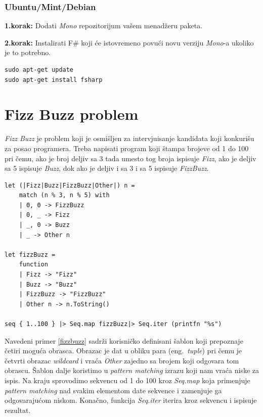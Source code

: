 \documentclass[a4paper]{article}
\begin{document}
\subsubsection{Ubuntu/Mint/Debian}

\textbf{1.korak:} Dodati {\em Mono} \cite{mono} repozitorijum vašem menadžeru paketa.

\textbf{2.korak:} Instalirati F\# koji će istovremeno povući novu verziju {\em Mono}-a ukoliko je to potrebno.
\\
\begin{lstlisting}
sudo apt-get update
sudo apt-get install fsharp
\end{lstlisting}
 
\section{Fizz Buzz problem}
\label{sec:fizzbuzz}
\textit{Fizz Buzz} je problem koji je osmišljen za intervjuisanje kandidata koji konkurišu za posao programera. Treba napisati program koji štampa brojeve od 1 do 100 pri čemu, ako je broj deljiv sa 3 tada umesto tog broja ispisuje \textit{Fizz}, ako je deljiv sa 5 ispisuje \textit{Buzz}, dok ako je deljiv i sa 3 i sa 5 ispisuje \textit{FizzBuzz}. \\

\begin{lstlisting}[caption={Fizz Buzz \cite{fizzBuzz}},frame=single, label=fizzbuzz]
let (|Fizz|Buzz|FizzBuzz|Other|) n =
    match (n % 3, n % 5) with
    | 0, 0 -> FizzBuzz
    | 0, _ -> Fizz
    | _, 0 -> Buzz
    | _ -> Other n

let fizzBuzz =
    function
    | Fizz -> "Fizz"
    | Buzz -> "Buzz"
    | FizzBuzz -> "FizzBuzz"
    | Other n -> n.ToString()

seq { 1..100 } |> Seq.map fizzBuzz|> Seq.iter (printfn "%s")
\end{lstlisting}

Navedeni primer \ref{fizzbuzz} sadrži korisničko definisani šablon koji prepoznaje četiri moguća obrasca. Obrazac je dat u obliku para (eng.~{\em tuple}) pri čemu je četvrti obrazac \textit{wildcard} i vraća \textit{Other} zajedno sa brojem koji odgovara tom obrascu. Šablon dalje koristimo u \textit{pattern matching} izrazu koji nam vraća niske za ispis. Na kraju sprovodimo sekvencu od 1 do 100 kroz \textit{Seq.map} koja primenjuje \textit{pattern matching} nad svakim elementom date sekvence i zamenjuje ga odgovarajućom niskom. Konačno, funkcija \textit{Seq.iter} iterira kroz sekvencu i ispisuje rezultat.
\end{document}
